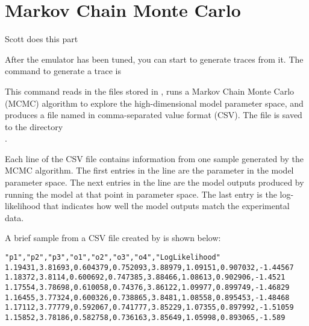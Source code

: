 \section{Markov Chain Monte Carlo}\label{sec:mcmc}

Scott does this part

After the emulator has been tuned, you can start to generate traces from it. The command to generate a trace is


This command reads in the files stored in , runs a Markov Chain Monte Carlo (MCMC) algorithm to explore the high-dimensional model parameter space, and produces a file named  in comma-separated value format (CSV). The  file is saved to the directory \\.

Each line of the CSV file contains information from one sample generated by the MCMC algorithm. The first entries in the line are the parameter in the model parameter space. The next entries in the line are the model outputs produced by running the model at that point in parameter space. The last entry is the log-likelihood that indicates how well the model outputs match the experimental data.

A brief sample from a CSV file created by   is shown below:

\begin{verbatim}
"p1","p2","p3","o1","o2","o3","o4","LogLikelihood"
1.19431,3.81693,0.604379,0.752093,3.88979,1.09151,0.907032,-1.44567
1.18372,3.8114,0.600692,0.747385,3.88466,1.08613,0.902906,-1.4521
1.17554,3.78698,0.610058,0.74376,3.86122,1.09977,0.899749,-1.46829
1.16455,3.77324,0.600326,0.738865,3.8481,1.08558,0.895453,-1.48468
1.17112,3.77779,0.592067,0.741777,3.85229,1.07355,0.897992,-1.51059
1.15852,3.78186,0.582758,0.736163,3.85649,1.05998,0.893065,-1.589
\end{verbatim}
